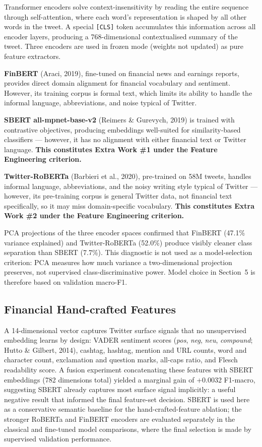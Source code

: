 \documentclass[11pt,a4paper]{article}
\begin{document}
Transformer encoders solve context-insensitivity by reading the entire sequence through
self-attention, where each word's representation is shaped by all other words in the tweet.
A special \texttt{[CLS]} token accumulates this information across all encoder layers, producing
a 768-dimensional contextualised summary of the tweet. Three encoders
are used in frozen mode (weights not updated) as pure feature extractors.

\textbf{FinBERT} (Araci, 2019), fine-tuned on financial news and earnings reports, provides
direct domain alignment for financial vocabulary and sentiment. However, its training corpus
is formal text, which limits its ability to handle the informal language, abbreviations, and
noise typical of Twitter.

\textbf{SBERT all-mpnet-base-v2} (Reimers \& Gurevych, 2019) is trained with contrastive
objectives, producing embeddings well-suited for similarity-based classifiers — however, it
has no alignment with either financial text or Twitter language.
\textbf{This constitutes Extra Work \#1 under the Feature Engineering criterion.}

\textbf{Twitter-RoBERTa} (Barbieri et al., 2020), pre-trained on 58M tweets, handles informal
language, abbreviations, and the noisy writing style typical of Twitter — however, its
pre-training corpus is general Twitter data, not financial text specifically, so it may miss
domain-specific vocabulary.
\textbf{This constitutes Extra Work \#2 under the Feature Engineering criterion.}

PCA projections of the three encoder spaces confirmed that FinBERT (47.1\% variance explained)
and Twitter-RoBERTa (52.0\%) produce visibly cleaner class separation than SBERT (7.7\%).
This diagnostic is not used as a model-selection criterion: PCA measures how much variance a
two-dimensional projection preserves, not supervised class-discriminative power. Model choice in
Section~5 is therefore based on validation macro-F1.

\subsection{Financial Hand-crafted Features}

A 14-dimensional vector captures Twitter surface signals that no unsupervised embedding learns
by design: VADER sentiment scores (\textit{pos}, \textit{neg}, \textit{neu}, \textit{compound};
Hutto \& Gilbert, 2014), cashtag, hashtag, mention and URL counts, word and character count,
exclamation and question marks, all-caps ratio, and Flesch readability score. A fusion
experiment concatenating these features with SBERT embeddings (782 dimensions total) yielded
a marginal gain of +0.0032 F1-macro, suggesting SBERT already captures most surface signal
implicitly: a useful negative result that informed the final feature-set decision. SBERT is used
here as a conservative semantic baseline for the hand-crafted-feature ablation; the stronger
RoBERTa and FinBERT encoders are evaluated separately in the classical and fine-tuned model
comparisons, where the final selection is made by supervised validation performance.
\end{document}

